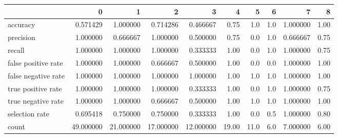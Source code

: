 \begin{tabular}{lrrrrrrrrr}
\toprule
{} &          0 &          1 &          2 &          3 &      4 &     5 &    6 &         7 &     8 \\
\midrule
accuracy            &   0.571429 &   1.000000 &   0.714286 &   0.466667 &   0.75 &   1.0 &  1.0 &  1.000000 &  1.00 \\
precision           &   1.000000 &   0.666667 &   1.000000 &   0.500000 &   0.75 &   0.0 &  1.0 &  0.666667 &  0.75 \\
recall              &   1.000000 &   1.000000 &   1.000000 &   0.333333 &   1.00 &   0.0 &  1.0 &  1.000000 &  0.75 \\
false positive rate &   1.000000 &   1.000000 &   0.666667 &   0.500000 &   1.00 &   0.0 &  0.0 &  1.000000 &  1.00 \\
false negative rate &   1.000000 &   1.000000 &   1.000000 &   1.000000 &   1.00 &   1.0 &  1.0 &  1.000000 &  1.00 \\
true positive rate  &   1.000000 &   1.000000 &   1.000000 &   0.333333 &   1.00 &   0.0 &  1.0 &  1.000000 &  0.75 \\
true negative rate  &   1.000000 &   1.000000 &   0.666667 &   0.500000 &   1.00 &   1.0 &  1.0 &  1.000000 &  1.00 \\
selection rate      &   0.695418 &   0.750000 &   0.750000 &   0.333333 &   1.00 &   0.0 &  0.5 &  1.000000 &  0.80 \\
count               &  49.000000 &  21.000000 &  17.000000 &  12.000000 &  19.00 &  11.0 &  6.0 &  7.000000 &  6.00 \\
\bottomrule
\end{tabular}
